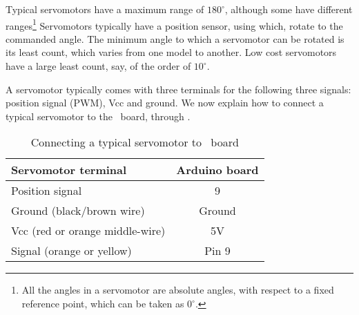 Typical servomotors have a maximum range of $180^\circ$, although some
have different ranges\footnote{All the angles in a servomotor are
  absolute angles, with respect to a fixed reference point, which can
  be taken as $0^\circ$.}
Servomotors typically have a position sensor,
using which, rotate to the commanded angle.  The minimum angle to
which a servomotor can be rotated is its least count, which varies
from one model to another.  Low cost servomotors have a large least
count, say, of the order of $10^\circ$.

A servomotor typically comes with three terminals for the
following three signals: position signal (PWM), Vcc and ground.
We now explain how to connect a typical servomotor to the \arduino\
board, through .
\begin{table}
\centering
\caption{Connecting a typical servomotor to \arduino\ board}
\label{tab:servo-connect}
\begin{tabular}{lc}\hline
Servomotor terminal & Arduino board \\ \hline
Position signal & 9 \\
Ground (black/brown wire) & Ground \\ 
Vcc (red or orange middle-wire) & 5V \\
Signal (orange or yellow) & Pin 9 \\ \hline
\end{tabular}
\end{table}

